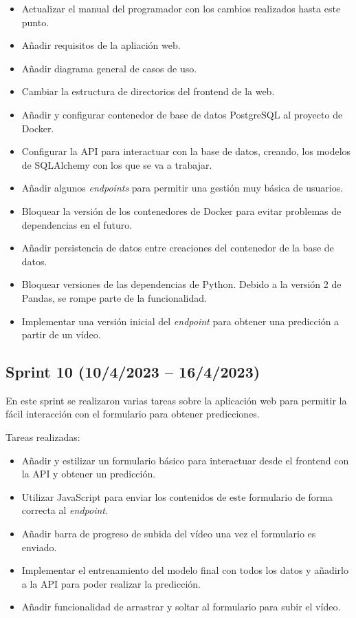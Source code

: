 \begin{itemize}
    \item Actualizar el manual del programador con los cambios realizados hasta
    este punto.
    \item Añadir requisitos de la apliación web.
    \item Añadir diagrama general de casos de uso.
    \item Cambiar la estructura de directorios del frontend de la web.
    \item Añadir y configurar contenedor de base de datos PostgreSQL al proyecto
    de Docker.
    \item Configurar la API para interactuar con la base de datos, creando, los
    modelos de SQLAlchemy con los que se va a trabajar.
    \item Añadir algunos \textit{endpoints} para permitir una gestión muy básica de
    usuarios.
    \item Bloquear la versión de los contenedores de Docker para evitar
    problemas de dependencias en el futuro.
    \item Añadir persistencia de datos entre creaciones del contenedor de la
    base de datos.
    \item Bloquear versiones de las dependencias de Python. Debido a la versión
    2 de Pandas, se rompe parte de la funcionalidad.
    \item Implementar una versión inicial del \textit{endpoint} para obtener una
    predicción a partir de un vídeo.
\end{itemize}

\subsection{Sprint 10 (10/4/2023 -- 16/4/2023)}

En este sprint se realizaron varias tareas sobre la aplicación web para permitir
la fácil interacción con el formulario para obtener predicciones.

Tareas realizadas:

\begin{itemize}
    \item Añadir y estilizar un formulario básico para interactuar desde el
    frontend con la API y obtener un predicción.
    \item Utilizar JavaScript para enviar los contenidos de este formulario de
    forma correcta al \textit{endpoint}.
    \item Añadir barra de progreso de subida del vídeo una vez el formulario es
    enviado.
    \item Implementar el entrenamiento del modelo final con todos los datos y
    añadirlo a la API para poder realizar la predicción.
    \item Añadir funcionalidad de arrastrar y soltar al formulario para subir el
    vídeo.
\end{itemize}

